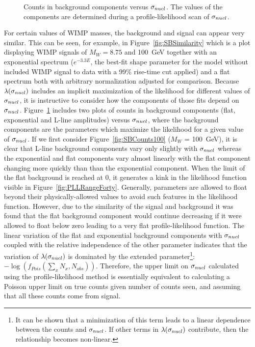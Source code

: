 			\begin{figure}
				\centering
				\caption[Counts in background components versus $\signuc$]
				{Counts in background components versus $\signuc$.  The values of the 
				components are determined during a profile-likelihood scan of $\signuc$.}
				\label{fig:SBCountsInComponents}
			\end{figure}	
		
For certain values of WIMP masses, the background and 	signal can appear very similar.  This can be seen, for example, in Figure~\ref{fig:SBSimilarity} which is a plot displaying WIMP signals of $M_{W}=8.75$ and 100~GeV together with an exponential spectrum ($e^{-3.3 E}$, the best-fit shape parameter for the model without included WIMP signal to data with a 99\% rise-time cut applied) and a flat spectrum both with arbitrary normalization adjusted for comparison.  Because $\lambda(\sigma_{nucl})$ includes an implicit maximization of the likelihood for different values of $\signuc$, it is instructive to consider how the components of those fits depend on $\signuc$.  Figure~\ref{fig:SBCountsInComponents} includes two plots of counts in background components (flat, exponential and L-line amplitudes) versus $\signuc$, where the background components are the parameters which maximize the likelihood for a given value of $\signuc$.  %
If we first consider Figure~\ref{fig:SBCounts100} ($M_{W}$ = 100~GeV), it is clear that L-line background components vary only slightly with $\signuc$ whereas the exponential and flat components vary almost linearly with the flat component changing more quickly than than the exponential component.  When the limit of the flat background is reached at 0, it generates a kink in the likelihood function visible in Figure~\ref{fig:PLLRangeForty}.  Generally, parameters are allowed to float beyond their physically-allowed values to avoid such features in the likelihood function.  However, due to the similarity of the signal and background it was found that the flat background component would continue decreasing if it were allowed to float below zero leading to a very flat profile-likelihood function.  The linear variation of the flat and exponential background components with $\signuc$ coupled with the relative independence of the other parameter indicates that the variation of $\lambda(\sigma_{nucl})$ is dominated by the extended parameter\footnote{It can be shown that a minimization of this term leads to a linear dependence between the counts and $\signuc$.  If other terms in $\lambda(\sigma_{nucl})$ contribute, then the relationship becomes non-linear.}: $-\log \left( f_{Pois} \left( \sum_{x} N_{x}, N_{obs} \right) \right)$.  Therefore, the upper limit on $\signuc$ calculated using the profile-likelihood method is essentially equivalent to calculating a Poisson upper limit on true counts given number of counts seen, and assuming that all these counts come from signal.  %

